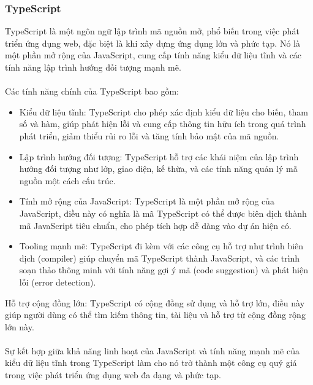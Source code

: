 \subsubsection*{TypeScript}
TypeScript là một ngôn ngữ lập trình mã nguồn mở, phổ biến trong việc phát triển ứng dụng web, đặc biệt là khi xây dựng ứng dụng lớn và phức tạp. Nó là một phần mở rộng của JavaScript, cung cấp tính năng kiểu dữ liệu tĩnh và các tính năng lập trình hướng đối tượng mạnh mẽ.\\
\\
Các tính năng chính của TypeScript bao gồm:
\begin{itemize}
    \item Kiểu dữ liệu tĩnh: TypeScript cho phép xác định kiểu dữ liệu cho biến, tham số và hàm, giúp phát hiện lỗi và cung cấp thông tin hữu ích trong quá trình phát triển, giảm thiểu rủi ro lỗi và tăng tính bảo mật của mã nguồn.
    \item Lập trình hướng đối tượng: TypeScript hỗ trợ các khái niệm của lập trình hướng đối tượng như lớp, giao diện, kế thừa, và các tính năng quản lý mã nguồn một cách cấu trúc.
    \item Tính mở rộng của JavaScript: TypeScript là một phần mở rộng của JavaScript, điều này có nghĩa là mã TypeScript có thể được biên dịch thành mã JavaScript tiêu chuẩn, cho phép tích hợp dễ dàng vào dự án hiện có.
    \item Tooling mạnh mẽ: TypeScript đi kèm với các công cụ hỗ trợ như trình biên dịch (compiler) giúp chuyển mã TypeScript thành JavaScript, và các trình soạn thảo thông minh với tính năng gợi ý mã (code suggestion) và phát hiện lỗi (error detection).
\end{itemize}
Hỗ trợ cộng đồng lớn: TypeScript có cộng đồng sử dụng và hỗ trợ lớn, điều này giúp người dùng có thể tìm kiếm thông tin, tài liệu và hỗ trợ từ cộng đồng rộng lớn này.\\
\\
Sự kết hợp giữa khả năng linh hoạt của JavaScript và tính năng mạnh mẽ của kiểu dữ liệu tĩnh trong TypeScript làm cho nó trở thành một công cụ quý giá trong việc phát triển ứng dụng web đa dạng và phức tạp.

